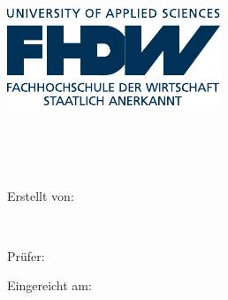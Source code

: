 
\begin{titlepage}

\begin{center}


\includegraphics[scale=1.20]{static/fhdw.pdf}\\

\vspace{.7cm}

\Huge{\bfseries\dokumententyp}

~\vspace{.5cm}\\

\LARGE{\dokumententitel}\\


~\vspace{1.3cm}\\


\large{

Erstellt von:\\\vspace{1mm}

\dokumentenautor\\

\vspace{1.5cm}

Prüfer:\vspace{1mm}\\

\dokumentenpruefer


\vspace{1.22cm}

Eingereicht am:\vspace{1mm}\\

\abgabedatum

}

\end{center}


\end{titlepage}

